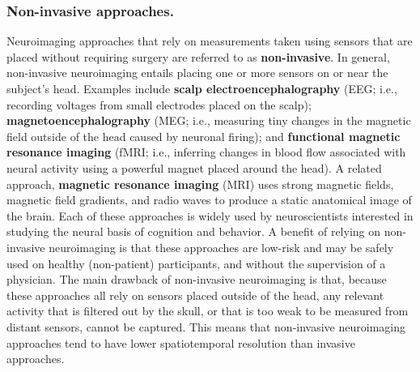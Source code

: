 \documentclass[runningheads]{llncs}
\begin{document}
\subsubsection{Non-invasive approaches.}
Neuroimaging approaches that rely on measurements taken using sensors
that are placed without requiring surgery are referred to as
\textbf{non-invasive}.  In general, non-invasive neuroimaging entails
placing one or more sensors on or near the subject's head.  Examples
include \textbf{scalp electroencephalography} (EEG; i.e., recording
voltages from small electrodes placed on the scalp);
\textbf{magnetoencephalography} (MEG; i.e., measuring tiny changes in
the magnetic field outside of the head caused by neuronal firing); and
\textbf{functional magnetic resonance imaging} (fMRI; i.e., inferring
changes in blood flow associated with neural activity using a powerful
magnet placed around the head).  A related approach, \textbf{magnetic
  resonance imaging} (MRI) uses strong magnetic fields, magnetic field
gradients, and radio waves to produce a static anatomical image of the
brain.  Each of these approaches is widely used by neuroscientists
interested in studying the neural basis of cognition and behavior.  A
benefit of relying on non-invasive neuroimaging is that these
approaches are low-risk and may be safely used on healthy
(non-patient) participants, and without the supervision of a
physician.  The main drawback of non-invasive neuroimaging is that,
because these approaches all rely on sensors placed outside of the
head, any relevant activity that is filtered out by the skull, or that
is too weak to be measured from distant sensors, cannot be captured.
This means that non-invasive neuroimaging approaches tend to have
lower spatiotemporal resolution than invasive approaches.
\end{document}
